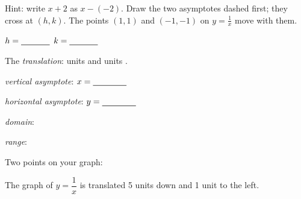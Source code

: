 Hint: write $x+2$ as $x-(-2)$. Draw the two asymptotes dashed first; they cross at $(h,k)$. The points $(1,1)$ and $(-1,-1)$ on $y=\frac{1}{x}$ move with them.

\begin{minipage}[t]{0.5\textwidth}
\vspace{0pt}
\end{minipage}\hfill
\begin{minipage}[t]{0.47\textwidth}
\vspace{0pt}\raggedright
$h=\blank[1.2cm]$ \qquad $k=\blank[1.2cm]$

\vspace{4pt}
The \emph{translation}: \blank[0.8cm] units \blank[1.4cm] and \blank[0.8cm] units \blank[1.4cm].

\vspace{4pt}
\emph{vertical asymptote}: $x=\blank[1.4cm]$

\vspace{4pt}
\emph{horizontal asymptote}: $y=\blank[1.4cm]$

\vspace{4pt}
\emph{domain}: \blank[3.4cm]

\vspace{4pt}
\emph{range}: \blank[3.6cm]

\vspace{4pt}
Two points on your graph: \blank[1.6cm] \blank[1.6cm]
\end{minipage}

The graph of $y=\dfrac{1}{x}$ is translated 5 units down and 1 unit to the left.


